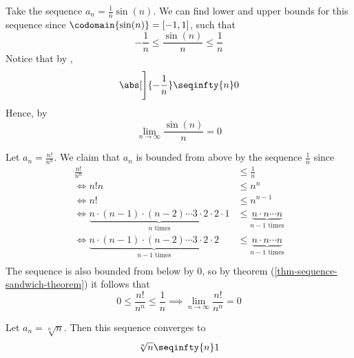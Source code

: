 \begin{exm}
	Take the sequence $a_n=\tfrac{1}{n}\sin(n)$. We can find lower and upper bounds
	for this sequence since $\codomain{\sin(n)}=[-1,1]$, such that
	\begin{equation*}
		-\frac{1}{n}\leq\frac{\sin(n)}{n}\leq\frac{1}{n}
	\end{equation*}
	Notice that by ,
	\begin{equation*}
		\abs[\Bigg]{-\frac{1}{n}} \seqinfty{n} 0
	\end{equation*}
	Hence, by 
	\begin{equation*}
		\lim_{n\to\infty}\frac{\sin(n)}{n}=0
	\end{equation*}
\end{exm}

\begin{exm}
	Let $a_n=\tfrac{n!}{n^n}$. We claim that $a_n$ is bounded from above by the
	sequence $\tfrac{1}{n}$ since
	\begin{align*}
		\frac{n!}{n^n}                                                                           & \leq\frac{1}{n}                                         \\
		\iff
		n!n                                                                                      & \leq n^n                                                \\
		\iff
		n!                                                                                       & \leq n^{n-1}                                            \\
		\iff
		\underbrace{n \cdot (n-1) \cdot (n-2) \cdots 3 \cdot 2 \cdot 2 \cdot 1}_{n\text{ times}} & \leq \underbrace{n \cdot n \cdots n}_{n-1\text{ times}} \\
		\iff
		\underbrace{n \cdot (n-1) \cdot (n-2) \cdots 3 \cdot 2 \cdot 2}_{n-1\text{ times}}       & \leq \underbrace{n \cdot n \cdots n}_{n-1\text{ times}} \\
	\end{align*}
	The sequence is also bounded from below by $0$, so by theorem (\ref{thm-sequence-sandwich-theorem})
	it follows that
	\begin{equation*}
		0\leq\frac{n!}{n^n}\leq\frac{1}{n}\implies\lim_{n\to\infty}\frac{n!}{n^n}=0
	\end{equation*}
\end{exm}

\begin{thm}\label{thm-sequence-nth-root}
	Let $a_n=\sqrt[n]{n}$. Then this sequence converges to
	\begin{equation*}
		\sqrt[n]{n} \seqinfty{n} 1
	\end{equation*}
\end{thm}

